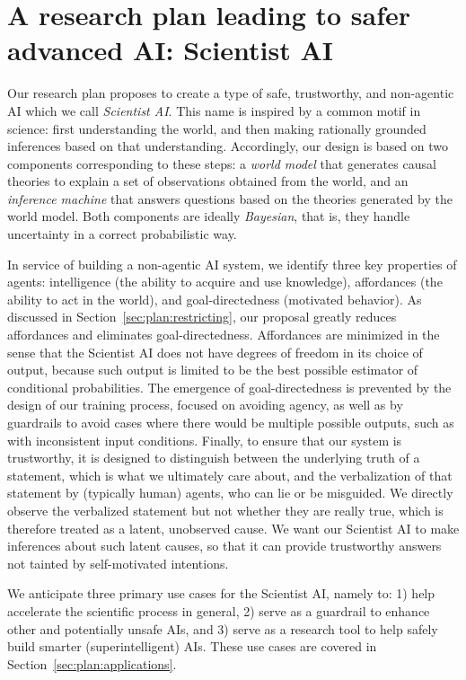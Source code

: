 \section{A research plan leading to safer advanced AI: Scientist AI}
\label{sec:plan}

Our research plan proposes to create a type of safe, trustworthy, and non-agentic AI which we call \textit{Scientist AI}. This name is inspired by a common motif in science: first understanding the world, and then making rationally grounded inferences based on that understanding. Accordingly, our design is based on two components corresponding to these steps: a \textit{world model} that generates causal theories to explain a set of observations obtained from the world, and an \textit{inference machine} that answers questions based on the theories generated by the world model.
Both components are ideally \emph{Bayesian}, that is, they handle uncertainty in a correct probabilistic way. 

In service of building a non-agentic AI system, we identify three key properties of agents: intelligence (the ability to acquire and use knowledge), affordances (the ability to act in the world), and goal-directedness (motivated behavior). As discussed in Section~\ref{sec:plan:restricting}, our proposal greatly reduces affordances and eliminates goal-directedness. Affordances are minimized in the sense that the Scientist AI does not have degrees of freedom in its choice of output, because such output is limited to be the best possible estimator of conditional probabilities. The emergence of goal-directedness is prevented by the design of our training process, focused on avoiding agency, as well as by guardrails to avoid cases where there would be multiple possible outputs, such as with inconsistent input conditions. Finally, to ensure that our system is trustworthy, it is designed to distinguish between the underlying truth of a statement, which is what we ultimately care about, and the verbalization of that statement by (typically human) agents, who can lie or be misguided. We directly observe the verbalized statement but not whether they are really true, which is therefore treated as a latent, unobserved cause. We want our Scientist AI to make inferences about such latent causes, so that it can provide trustworthy answers not tainted by self-motivated intentions.

We anticipate three primary use cases for the Scientist AI, namely to: 1) help accelerate the scientific process in general, 2) serve as a guardrail to enhance other and potentially unsafe AIs, and 3) serve as a research tool to help safely build smarter (superintelligent) AIs. These use cases are covered in Section~\ref{sec:plan:applications}.


